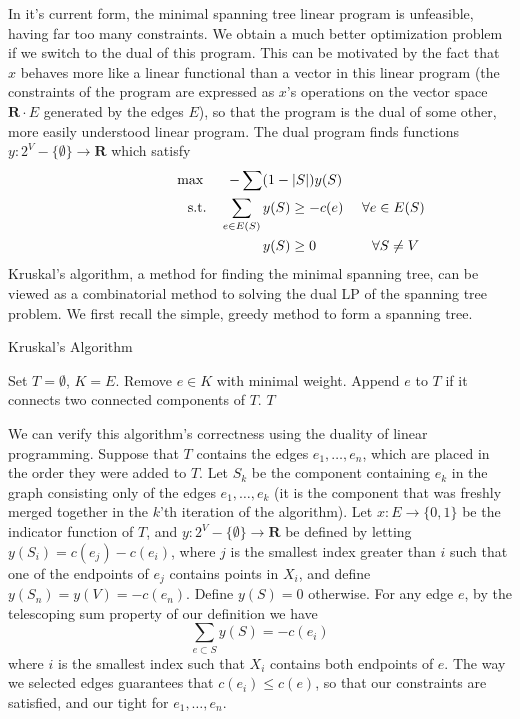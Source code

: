 In it's current form, the minimal spanning tree linear program is unfeasible, having far too many constraints. We obtain a much better optimization problem if we switch to the dual of this program. This can be motivated by the fact that $x$ behaves more like a linear functional than a vector in this linear program (the constraints of the program are expressed as $x$'s operations on the vector space $\mathbf{R} \cdot E$ generated by the edges $E$), so that the program is the dual of some other, more easily understood linear program. The dual program finds functions $y: 2^V - \{ \emptyset \} \to \mathbf{R}$ which satisfy
%
\begin{gather*}
\max \quad\ \  -\sum (1 - |S|) y(S) \\
\begin{aligned}
\ \ \ \ \ \ \ \ \ \ \ \ \ \ \ \ \ \ \ \ \textup{s.t.} \quad \sum_{e \in E(S)} y(S) &\geq -c(e)\ \ \ \ \forall e \in E(S) \\
                   y(S) &\geq 0\ \ \ \ \ \ \ \ \ \ \ \ \forall S \neq V
\end{aligned}
\end{gather*}
%
Kruskal's algorithm, a method for finding the minimal spanning tree, can be viewed as a combinatorial method to solving the dual LP of the spanning tree problem. We first recall the simple, greedy method to form a spanning tree.
%
\begin{algorithm}
\caption{Kruskal's Algorithm}
\begin{algorithmic}[1]
\State Set $T = \emptyset$, $K = E$.
\State Remove $e \in K$ with minimal weight.
\State Append $e$ to $T$ if it connects two connected components of $T$.
\EndWhile
\State \Return $T$
\end{algorithmic}
\end{algorithm}
%
We can verify this algorithm's correctness using the duality of linear programming. Suppose that $T$ contains the edges $e_1, \dots, e_n$, which are placed in the order they were added to $T$. Let $S_k$ be the component containing $e_k$ in the graph consisting only of the edges $e_1, \dots, e_k$ (it is the component that was freshly merged together in the $k$'th iteration of the algorithm). Let $x: E \to \{ 0, 1 \}$ be the indicator function of $T$, and $y: 2^V - \{ \emptyset \} \to \mathbf{R}$ be defined by letting $y(S_i) = c(e_j) - c(e_i)$, where $j$ is the smallest index greater than $i$ such that one of the endpoints of $e_j$ contains points in $X_i$, and define $y(S_n) = y(V) = - c(e_n)$. Define $y(S) = 0$ otherwise. For any edge $e$, by the telescoping sum property of our definition we have
%
\[ \sum_{e \subset S} y(S) = -c(e_i) \]
%
where $i$ is the smallest index such that $X_i$ contains both endpoints of $e$. The way we selected edges guarantees that $c(e_i) \leq c(e)$, so that our constraints are satisfied, and our tight for $e_1, \dots, e_n$.

